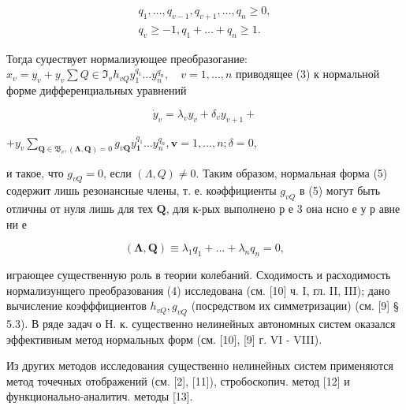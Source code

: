 \documentclass[10pt]{article}
\begin{document}
\[

\begin{gathered}

q_{1}, \ldots, q_{v-1}, q_{v+1}, \ldots, q_{n} \geqslant 0, \\

q_{v} \geqslant-1, q_{1}+\ldots+q_{n} \geqslant 1 .

\end{gathered}

\]



Тогда суџествует нормализующее преобразогание: $x_{v}=y_{v}+y_{v} \sum Q \in \mathfrak{I}_{v} h_{v Q} y_{1}^{q_{1}} \ldots y_{n}^{q_{n}}, \quad v=1, \ldots, n$ приводящее (3) к нормальной форме дифференциальных уравнений



\[

\dot{y}_{v}=\lambda_{v} y_{v}+\delta_{v} y_{v+1}+

\]



$+y_{v} \sum_{\boldsymbol{Q} \in \mathfrak{B}_{v},(\boldsymbol{\Lambda}, \boldsymbol{Q})=0} g_{v \boldsymbol{Q}} y_{\mathbf{1}}^{q_{1}} \ldots y_{n}^{q_{n}}, \boldsymbol{v}=1, \ldots, n ; \delta=0$,



и такое, что $g_{v Q}=0$, если $(\Lambda, Q) \neq 0$. Таким образом, нормальная форма (5) содержит лишь резонансные члены, т. е. коәффициенты $g_{v Q}$ в (5) могут быть отличны от нуля лишь для тех $\boldsymbol{Q}$, для к-рых выполнено р е 3 она нсно е у р авне ни е



\[

(\boldsymbol{\Lambda}, \boldsymbol{Q}) \equiv \lambda_{1} q_{1}+\ldots+\lambda_{n} q_{n}=0,

\]



играющее существенную роль в теории колебаний. Сходимость и расходимость нормализунщего преобразования (4) исследована (см. [10] ч. I, гл. II, III); дано вычисление коэфффициентов $h_{v Q}, g_{v Q}$ (посредством их симметризации) (см. [9] § 5.3). В ряде задач о Н. к. существенно нелинейных автономных систем оказался эффективным метод нормальных форм (см. [10], [9] г. VI - VIII).



Из других методов исследования существенно нелинейных систем применяются метод точечных отображений (см. [2], [11]), стробоскопич. метод [12] и функционально-аналитич. методы [13].
\end{document}

